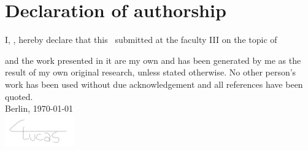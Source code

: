 \chapter*{Declaration of authorship}

I, \myauthor, hereby declare that this \mysubject\ submitted at the faculty III on the topic of
\vspace{0.5cm}
\begin{center}
	\textbf{\mytitle}
\end{center}
\vspace{0.5cm}
and the work presented in it are my own and has been generated by me as the result of my own original research, unless stated otherwise. No other person’s work has been used without due acknowledgement and all references have been quoted.
\\[4ex]
Berlin, \today \\
\includegraphics[width=3cm]{./images/signature.png}
\\[-4ex] \newline
\myauthor
